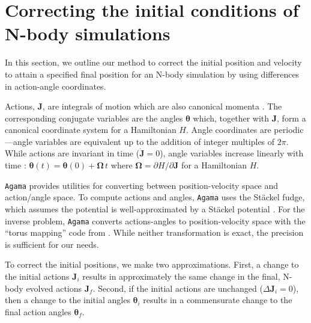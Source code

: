 \documentclass[linenumbers, twocolumn, twocolappendix]{aastex701}
\newcommand{\agama}{\texttt{Agama}}
\begin{document}

\appendix

\section{Correcting the initial conditions of N-body simulations} \label{sec:action_correction}

In this section, we outline our method to correct the initial position and velocity to attain a specified final position for an N-body simulation by using differences in action-angle coordinates.

Actions, $\mathbf{J}$, are integrals of motion which are also canonical momenta \citep[see, e.g.,][section 3.5]{BT2008}. The corresponding conjugate variables are the angles $\bm\theta$ which, together with $\mathbf J$, form a canonical coordinate system for a Hamiltonian $H$.
Angle coordinates are periodic---angle variables are equivalent up to the addition of integer multiples of $2\pi$.
While actions are invariant in time ($\dot{\mathbf J} = 0$), angle variables increase linearly with time : $\bm\theta(t) = \bm\theta(0) + \bm \Omega\,t$ where $\bm\Omega = \partial H / \partial \mathbf J$ for a Hamiltonian $H$. 

\agama{} provides utilities for converting between position-velocity space and action/angle space. To compute actions and angles, \agama{} uses the St\"ackel fudge, which assumes the potential is well-approximated by a St\"ackel potential \citep[see]{BT2008}. For the inverse problem, \agama{} converts actions-angles to position-velocity space with the ``torus mapping'' code from \citet{binney+mcmillan2016}. While neither transformation is exact, the precision is sufficient for our needs. 

To correct the initial positions, we make two approximations. First, a change to the initial actions $\mathbf J_i$ results in approximately the same change in the final, N-body evolved actions $\mathbf J_f$. Second, if the initial actions are unchanged ($\Delta \mathbf J_i = 0$),  then a change to the initial angles $\bm \theta_i$ results in a commensurate change to the final action angles $\bm \theta_f$. 
\end{document}
